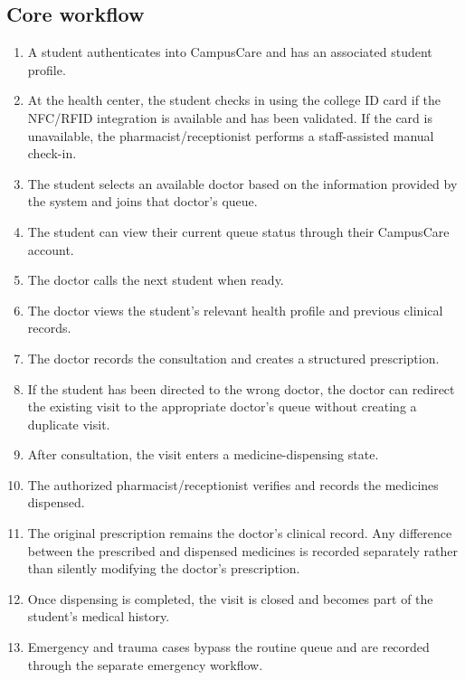 \documentclass[11pt,a4paper]{article}
\begin{document}
\subsection{Core workflow}

\begin{enumerate}

    \item A student authenticates into CampusCare and has an associated student profile.

    \item At the health center, the student checks in using the college ID card if the NFC/RFID integration is available and has been validated. If the card is unavailable, the pharmacist/receptionist performs a staff-assisted manual check-in.

    \item The student selects an available doctor based on the information provided by the system and joins that doctor's queue.

    \item The student can view their current queue status through their CampusCare account.

    \item The doctor calls the next student when ready.

    \item The doctor views the student's relevant health profile and previous clinical records.

    \item The doctor records the consultation and creates a structured prescription.

    \item If the student has been directed to the wrong doctor, the doctor can redirect the existing visit to the appropriate doctor's queue without creating a duplicate visit.

    \item After consultation, the visit enters a medicine-dispensing state.

    \item The authorized pharmacist/receptionist verifies and records the medicines dispensed.

    \item The original prescription remains the doctor's clinical record. Any difference between the prescribed and dispensed medicines is recorded separately rather than silently modifying the doctor's prescription.

    \item Once dispensing is completed, the visit is closed and becomes part of the student's medical history.

    \item Emergency and trauma cases bypass the routine queue and are recorded through the separate emergency workflow.

\end{enumerate}
\end{document}
